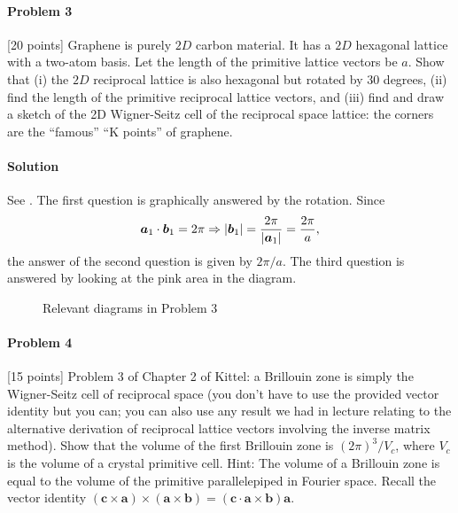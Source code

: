\documentclass[hyperref, a4paper]{article}
\begin{document}
\paragraph{Problem 3} [20 points] Graphene is purely $2 D$ carbon material. It has a $2 D$ hexagonal lattice with a two-atom basis. 
Let the length of the primitive lattice vectors be $a$. Show that (i) the $2 D$ reciprocal lattice is also hexagonal but rotated by 30 degrees, (ii) find the length of the primitive reciprocal lattice vectors, and (iii) find and draw a sketch of the 2D Wigner-Seitz cell of the reciprocal space lattice: the corners are the ``famous'' ``K points'' of graphene.

\paragraph{Solution} See . 
The first question is graphically answered by the rotation.
Since
\[
    \vb*{a}_1 \cdot \vb*{b}_1 = 2\pi \Rightarrow \abs{\vb*{b}_1} = \frac{2\pi}{\abs{\vb*{a}_1}} = \frac{2\pi}{a},
\]
the answer of the second question is given by $2\pi / a$.
The third question is answered by looking at the pink area in the diagram.

\begin{figure}
    \centering
    
    \caption{Relevant diagrams in Problem 3}
    \label{fig:problem-3-answer}
\end{figure}

\paragraph{Problem 4} [15 points] Problem 3 of Chapter 2 of Kittel: a Brillouin zone is simply the Wigner-Seitz cell of reciprocal space (you don't have to use the provided vector identity but you can; you can also use any result we had in lecture relating to the alternative derivation of reciprocal lattice vectors involving the inverse matrix method).
Show that the volume of the first Brillouin zone is $(2 \pi)^3 / V_c$, where $V_c$ is the volume of a crystal primitive cell. Hint: The volume of a Brillouin zone is equal to the volume of the primitive parallelepiped in Fourier space. Recall the vector identity $(\mathbf{c} \times \mathbf{a}) \times(\mathbf{a} \times \mathbf{b})=(\mathbf{c} \cdot \mathbf{a} \times \mathbf{b}) \mathbf{a}$.
\end{document}
